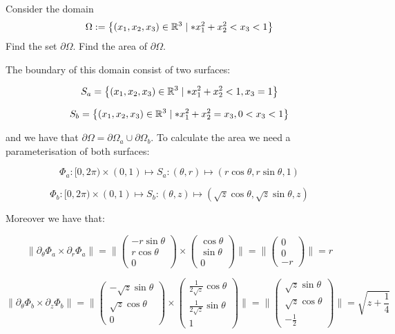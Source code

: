 \documentclass[11pt]{article}
\begin{document}
\begin{exercise}
    Consider the domain 
    \begin{gather*}
        \Omega := \left\{ (x_1,x_2,x_3) \in \mathbb R^3 \suchthat* x_1^2 + x_2^2 < x_3 < 1 \right\}
    \end{gather*}
    Find the set $\partial\Omega$. Find the area of $\partial\Omega$. 
\end{exercise}
\begin{solution} 
The boundary of this domain consist of two surfaces:

$$
S_a =\left\{ (x_1,x_2,x_3) \in \mathbb R^3 \suchthat* x_1^2 + x_2^2 < 1, x_3 = 1 \right\} 
$$

$$
S_b =\left\{ (x_1,x_2,x_3) \in \mathbb R^3 \suchthat* x_1^2 + x_2^2 = x_3, 0<x_3<1 \right\} 
$$

and we have that $\partial \Omega = \partial \Omega_a \cup \partial \Omega_b$. To calculate the area we need a parameterisation of both surfaces:

$$
\Phi_a: [0,2\pi) \times (0,1) \mapsto S_a: (\theta,r)\mapsto (r\cos\theta, r\sin\theta,1)
$$

$$
\Phi_b: [0,2\pi) \times (0,1) \mapsto S_b: (\theta,z)\mapsto (\sqrt{z}\cos\theta, \sqrt{z}\sin\theta,z)
$$

Moreover we have that:

$$
\|\partial_{\theta}\Phi_{a}\times \partial_r\Phi_{a}\|  = \|\begin{pmatrix} -r\sin\theta \\ r\cos\theta\\0 \end{pmatrix} \times \begin{pmatrix} \cos\theta \\ \sin\theta \\0 \end{pmatrix}\| = \|\begin{pmatrix} 0 \\ 0 \\ -r \end{pmatrix}\| = r
$$

$$
\|\partial_{\theta}\Phi_{b}\times \partial_z\Phi_{b}\|  = \|\begin{pmatrix} -\sqrt{z}\sin\theta \\ \sqrt{z}\cos\theta\\0 \end{pmatrix} \times \begin{pmatrix} \frac{1}{2\sqrt{z}}\cos\theta \\  \frac{1}{2\sqrt{z}}\sin\theta \\1 \end{pmatrix}\| = \|\begin{pmatrix} \sqrt{z}\sin\theta \\ \sqrt{z}\cos\theta\\-\frac{1}{2} \end{pmatrix}\| = \sqrt{z+\frac{1}{4}}
$$


\end{solution}
\end{document}

